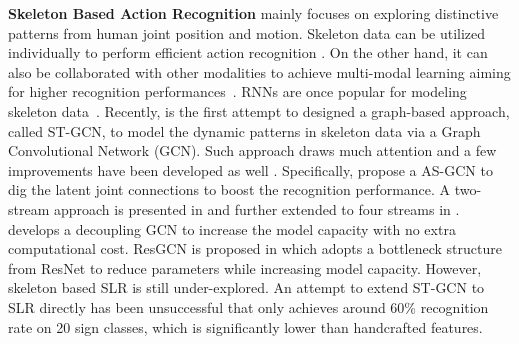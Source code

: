 \documentclass[final]{cvpr}
\begin{document}
\noindent\textbf{Skeleton Based Action Recognition} mainly focuses on exploring distinctive patterns from human joint position and motion. Skeleton data can be utilized individually to perform efficient action recognition \cite{cai2021jolo, du2015hierarchical, huang2017deep, li2019actional, li2018independently, liu2016spatio}. On the other hand, it can also be collaborated with other modalities to achieve multi-modal learning aiming for higher recognition performances~\cite{baradel2017human, carreira2017quo, choutas2018potion, hu2018deep, zolfaghari2017chained}. 
RNNs are once popular for modeling skeleton data~\cite{du2015hierarchical, liu2016spatio, li2018independently, si2018skeleton}. 
Recently, \cite{yan2018spatial} is the first attempt to designed a graph-based approach, called ST-GCN, to model the dynamic patterns in skeleton data via a Graph Convolutional Network (GCN). Such approach draws much attention and a few improvements have been developed as well \cite{li2019actional, shi2019skeleton, shi2019two, si2019attention, shi2020skeleton, chengdecoupling, song2020stronger}. Specifically,
\cite{li2019actional} propose a AS-GCN to dig the latent joint connections to boost the recognition performance. A two-stream approach is presented in \cite{shi2019two} and further extended to four streams in \cite{shi2020skeleton}. \cite{chengdecoupling} develops a decoupling GCN to increase the model capacity with no extra computational cost. ResGCN is proposed in \cite{song2020stronger} which adopts a bottleneck structure from ResNet \cite{he2016deep} to reduce parameters while increasing model capacity. 
However, skeleton based SLR is still under-explored. An attempt to extend ST-GCN to SLR directly \cite{de2019spatial} has been unsuccessful that only achieves around 60\% recognition rate on 20 sign classes, which is significantly lower than handcrafted features. 
\end{document}
